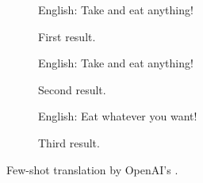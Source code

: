 \documentclass{article}
\begin{document}
\begin{figure*}[h!]
    \centering
    \begin{subfigure}{\textwidth}
        \begin{tcolorbox}[colframe=black!10!white, colback=black!5!white]
            \begin{minipage}{\textwidth}
                \ttfamily
                English: Take and eat anything!
            \end{minipage}
        \end{tcolorbox}
        \vspace{-0.5\baselineskip}
        \caption{First result.}
        \vspace{0.5\baselineskip}
    \end{subfigure}
    \hfill
    \begin{subfigure}{\textwidth}
        \begin{tcolorbox}[colframe=black!10!white, colback=black!5!white]
            \begin{minipage}{\textwidth}
                \ttfamily
                English: Take and eat anything!
            \end{minipage}
        \end{tcolorbox}
        \vspace{-0.5\baselineskip}
        \caption{Second result.}
        \vspace{0.5\baselineskip}
    \end{subfigure}
    \hfill
    \begin{subfigure}{\textwidth}
        \begin{tcolorbox}[colframe=black!10!white, colback=black!5!white]
            \begin{minipage}{\textwidth}
                \ttfamily
                English: Eat whatever you want!
            \end{minipage}
        \end{tcolorbox}
        \vspace{-0.5\baselineskip}
        \caption{Third result.}
        \vspace{0.5\baselineskip}
    \end{subfigure}
    \caption{Few-shot translation by OpenAI's .}
    \label{E5:few-shot}
\end{figure*}
\end{document}
